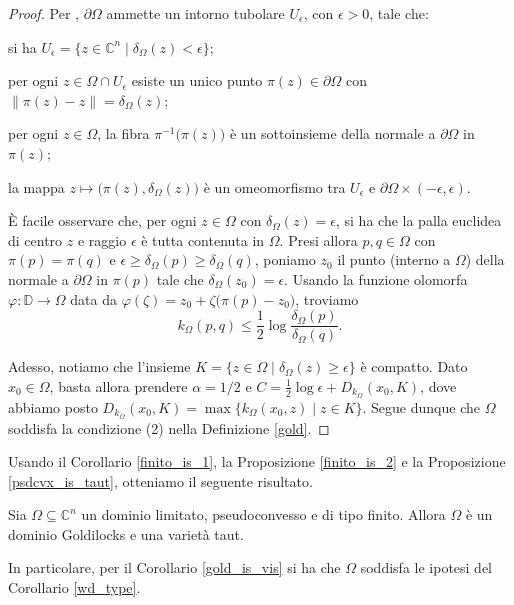 \begin{proof}
    Per \cite[Chapter 9, Theorem 20]{Sp}, $\partial\Omega$ ammette un intorno tubolare $U_\epsilon$, con $\epsilon>0$, tale che:
    \begin{nlist}
        \item si ha $U_\epsilon=\{z\in\mathbb{C}^n\mid\delta_\Omega(z)<\epsilon\}$;
        \item per ogni $z\in\Omega\cap U_\epsilon$ esiste un unico punto $\pi(z)\in\partial\Omega$ con $\|\pi(z)-z\|=\delta_\Omega(z)$;
        \item per ogni $z\in\Omega$, la fibra $\pi^{-1}\big(\pi(z)\big)$ è un sottoinsieme della normale a $\partial\Omega$ in $\pi(z)$;
        \item la mappa $z\longmapsto\big(\pi(z),\delta_\Omega(z)\big)$ è un omeomorfismo tra $U_\epsilon$ e $\partial\Omega\times(-\epsilon,\epsilon)$.
    \end{nlist}
    È facile osservare che, per ogni $z\in\Omega$ con $\delta_\Omega(z)=\epsilon$, si ha che la palla euclidea di centro $z$ e raggio $\epsilon$ è tutta contenuta in $\Omega$. Presi allora $p,q\in\Omega$ con $\pi(p)=\pi(q)$ e $\epsilon\ge\delta_\Omega(p)\ge\delta_\Omega(q)$, poniamo $z_0$ il punto (interno a $\Omega$) della normale a $\partial\Omega$ in $\pi(p)$ tale che $\delta_\Omega(z_0)=\epsilon$. Usando la funzione olomorfa $\varphi:\mathbb{D}\longrightarrow\Omega$ data da $\varphi(\zeta)=z_0+\zeta\big(\pi(p)-z_0\big)$, troviamo
    $$k_\Omega(p,q) \le \dfrac{1}{2}\log{\dfrac{\delta_\Omega(p)}{\delta_\Omega(q)}}.$$

    Adesso, notiamo che l'insieme $K=\{z\in\Omega\mid\delta_\Omega(z)\ge\epsilon\}$ è compatto. Dato $x_0\in\Omega$, basta allora prendere $\alpha=1/2$ e $C=\frac{1}{2}\log{\epsilon}+D_{k_{\Omega}}(x_0,K)$, dove abbiamo posto $D_{k_\Omega}(x_0,K)=\max\{k_\Omega(x_0,z)\mid z\in K\}$. Segue dunque che $\Omega$ soddisfa la condizione (2) nella Definizione \ref{gold}.
\end{proof}

Usando il Corollario \ref{finito_is_1}, la Proposizione \ref{finito_is_2} e la Proposizione \ref{psdcvx_is_taut}, otteniamo il seguente risultato.

\begin{cor}
    Sia $\Omega\subseteq\mathbb{C}^n$ un dominio limitato, pseudoconvesso e di tipo finito. Allora $\Omega$ è un dominio Goldilocks e una varietà taut.
    
    In particolare, per il Corollario \ref{gold_is_vis} si ha che $\Omega$ soddisfa le ipotesi del Corollario \ref{wd_type}.
\end{cor}